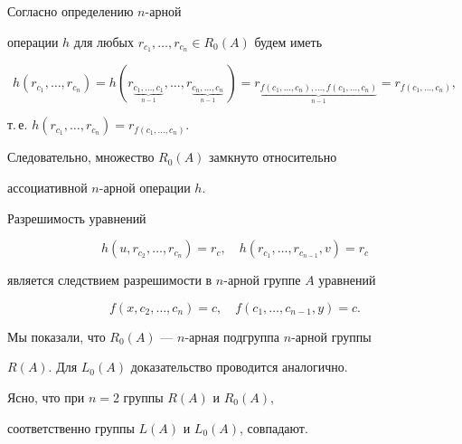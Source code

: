 \begin{pf}


Согласно определению $n$-арной


операции $h$ для любых $r_{c_1},\dotsc,r_{c_n}\in R_0(A)$ будем иметь


$$


h(r_{c_1},\dotsc,r_{c_n})=


h(r_{\underbrace{\scriptstyle{c_1,\dotsc,c_1}}_{n-1}},\dotsc,


r_{\underbrace{\scriptstyle{c_n,\dotsc,c_n}}_{n-1}}\,)=


r_{\underbrace{\scriptstyle{f(c_1,\dotsc,c_n),\dotsc,


f(c_1,\dotsc,c_n)}}_{n-1}}=r_{f(c_1,\dotsc,c_n)},


$$


т.\,е. $h(r_{c_1},\dotsc,r_{c_n})=r_{f(c_1,\dotsc,c_n)}$.


Следовательно, множество $R_0(A)$ замкнуто относительно


ассоциативной $n$-арной операции $h$.





Разрешимость уравнений


$$


h(u,r_{c_2},\dotsc,r_{c_n})=r_c,\quad


h(r_{c_1},\dotsc,r_{c_{n-1}},v)=r_c


$$


является следствием разрешимости в $n$-арной группе $A$ уравнений


$$


f(x,c_2,\dotsc,c_n) = c,\quad f(c_1,\dotsc,c_{n-1},y) = c.


$$


Мы показали, что $R_0(A)$ --- $n$-арная подгруппа $n$-арной группы


$R(A)$. Для $L_0(A)$ доказательство проводится аналогично.


\end{pf}





\begin{notenonum}


Ясно, что при $n = 2$ группы $R(A)$ и $R_0(A)$,


соответственно группы $L(A)$ и $L_0(A)$, совпадают.


\end{notenonum}





